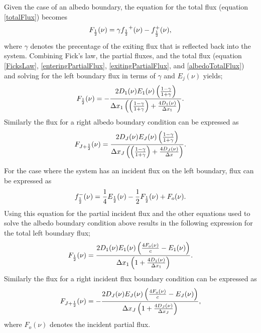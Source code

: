 	Given the case of an albedo boundary, the equation for the total flux (equation \ref{totalFlux}) becomes
	\begin{equation}
	\label{albedoTotalFlux}
	F_{{1\over{2}}}(\nu)=\gamma{f_{{1\over{2}}}}^{+}(\nu)-{f_{{1\over{2}}}^+(\nu)},
	\end{equation}
	where $\gamma$ denotes the precentage of the exiting flux that is reflected back into the system. Combining Fick's law, the partial fluxes, and the total flux (equation \ref{FicksLaw}, \ref{enteringPartialFlux}, \ref{exitingPartialFlux}, and \ref{albedoTotalFlux}) and solving for the left boundary flux in terms of $\gamma$ and $E_{j}(\nu)$ yields;
	\begin{equation}
	\label{albedoBoundar}
	F_{{1\over{2}}}(\nu)=-{2D_1(\nu)E_1(\nu)\left({1-\gamma\over{1+\gamma}}\right)\over{\Delta{x_1}\left(\left({1-\gamma\over{1+\gamma}}\right)+{4D_1(\nu)\over{\Delta{x}_1}}\right)}}.
	\end{equation}
	Similarly the flux for a right albedo boundary condition can be expressed as
	\begin{equation}
	\label{albedoBoundar}
	F_{J+{1\over{2}}}(\nu)={2D_J(\nu)E_J(\nu)\left({1-\gamma\over{1+\gamma}}\right)\over{\Delta{x_J}\left(\left({1-\gamma\over{1+\gamma}}\right)+{4D_J(\nu)\over{\Delta{x}}}\right)}}.
	\end{equation}

	For the case where the system has an incident flux on the left boundary, flux can be expressed as
	\begin{equation}
	\label{incidentPartialFlux}
	f_{{1\over{2}}}^-(\nu)={1\over{4}}E_{{1\over{2}}}(\nu)-{1\over{2}}F_{{1\over{2}}}(\nu)+F_o(\nu).
	\end{equation}
	Using this equation for the partial incident flux and the other equations used to solve the albedo boundary condition above results in the following expression for the total left boundary flux;
	\begin{equation}
	\label{incidentBoundaryCondition}
	F_{{1\over{2}}}(\nu)={2D_1(\nu)E_1(\nu)\left({4F_o(\nu)\over{c}}-E_1(\nu)\right)\over{\Delta{x_1}\left(1+{4D_1(\nu)\over{\Delta{x}_1}}\right)}}.
	\end{equation}
	Similarly the flux for a right incident flux boundary condition can be expressed as
	\begin{equation}
	\label{incidentBoundaryCondition}
	F_{J+{1\over{2}}}(\nu)=-{2D_J(\nu)E_J(\nu)\left({4F_o(\nu)\over{c}}-E_J(\nu)\right)\over{\Delta{x_J}\left(1+{4D_J(\nu)\over{\Delta{x}_J}}\right)}},
	\end{equation}
	where $F_o(\nu)$ denotes the incident partial flux.

